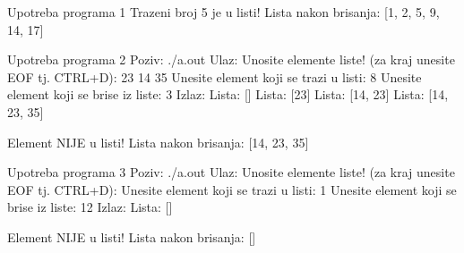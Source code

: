 \begin{Exercise}[label=603]
\begin{maxitest}
\begin{test}{Upotreba programa 1}
        Trazeni broj 5 je u listi!
        Lista nakon brisanja:  [1, 2, 5, 9, 14, 17]
\end{test}
\end{maxitest}



\begin{maxitest}
\begin{test}{Upotreba programa 2}
Poziv: ./a.out
Ulaz:
	Unosite elemente liste! (za kraj unesite EOF tj. CTRL+D): 23 14 35
	Unesite element koji se trazi u listi: 8
	Unesite element koji se brise iz liste: 3
Izlaz:
	Lista: []
        Lista: [23]
        Lista: [14, 23]
        Lista: [14, 23, 35]
        
        Element NIJE u listi!
        Lista nakon brisanja:  [14, 23, 35]
\end{test}
\end{maxitest}

\begin{maxitest}
\begin{test}{Upotreba programa 3}
Poziv: ./a.out
Ulaz:
	Unosite elemente liste! (za kraj unesite EOF tj. CTRL+D): 
	Unesite element koji se trazi u listi: 1
	Unesite element koji se brise iz liste: 12
Izlaz:
        Lista: []
        
        Element NIJE u listi!
        Lista nakon brisanja:  []
\end{test}
\end{maxitest}

\end{Exercise}
\begin{Answer}[ref=603]
\end{Answer}








